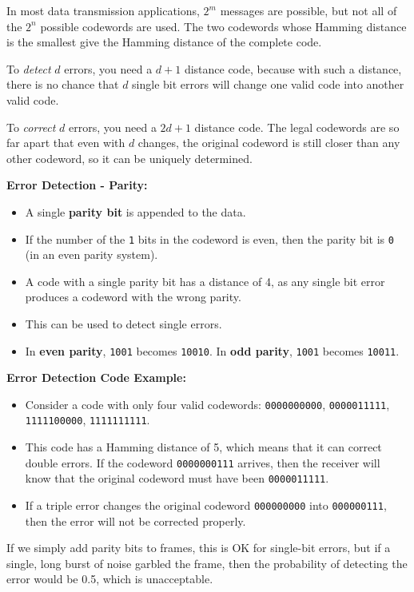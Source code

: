 \documentclass[11pt]{article}
\begin{document}
In most data transmission applications, $2^m$ messages are possible, but not all of the $2^n$ possible codewords are 
used. 
The two codewords whose Hamming distance is the smallest give the Hamming distance of the complete code.

To \textit{detect} $d$ errors, you need a $d+1$ distance code, because with such a distance, there is no chance that $d$ single 
bit errors will change one valid code into another valid code.

To \textit{correct} $d$ errors, you need a $2d+1$ distance code. 
The legal codewords are so far apart that even with $d$ changes, the original codeword is still closer than any other 
codeword, so it can be uniquely determined.

\textbf{Error Detection - Parity:} 
\begin{itemize}
    \item   A single \textbf{parity bit} is appended to the data. 
    \item   If the number of the \verb|1| bits in the codeword is even, then the parity bit is \verb|0| (in an even 
            parity system). 
    \item   A code with a single parity bit has a distance of 4, as any single bit error produces a codeword with the 
            wrong parity.
    \item   This can be used to detect single errors.
    \item   In \textbf{even parity}, \verb|1001| becomes \verb|10010|. 
            In \textbf{odd parity}, \verb|1001| becomes \verb|10011|. 
\end{itemize}

\textbf{Error Detection Code Example:}
\begin{itemize}
    \item   Consider a code with only four valid codewords: \verb|0000000000|, \verb|0000011111|, \verb|1111100000|, 
            \verb|1111111111|. 
    \item   This code has a Hamming distance of 5, which means that it can correct double errors. 
            If the codeword \verb|0000000111| arrives, then the receiver will know that the original codeword must have 
            been \verb|0000011111|.
    \item   If a triple error changes the original codeword \verb|000000000| into \verb|000000111|, then the error will 
            not be corrected properly.
\end{itemize}

If we simply add parity bits to frames, this is OK for single-bit errors, but if a single, long burst of noise garbled 
the frame, then the probability of detecting the error would be 0.5, which is unacceptable.
\end{document}
